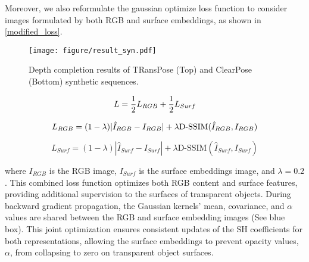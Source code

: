 Moreover, we also reformulate the gaussian optimize loss function to consider images formulated by both RGB and surface embeddings, as shown in \eqref{modified_loss}.
\begin{figure*}[]
    \centering
    \texttt{[image: figure/result\_syn.pdf]}
    \caption{Depth completion results of TRansPose (Top) and ClearPose (Bottom) synthetic sequences.}
    \label{fig:syn}
    \vspace{-2mm}
\end{figure*}



 

\small
\begin{equation}
    L = \frac{1}{2}L_{RGB} + \frac{1}{2}L_{Surf}
\label{modified_loss}
\vspace{-4mm}
\end{equation}

\begin{equation}
    L_{RGB} = (1-\lambda)|\hat{I}_{RGB}-I_{RGB}| + \lambda\text{D-SSIM}({\hat{I}_{RGB}, I_{RGB}})
\label{RGB_loss}
\vspace{-4mm}
\end{equation}


\begin{equation}
    L_{Surf} = (1-\lambda)|\hat{I}_{Surf}-I_{Surf}| + \lambda \text{D-SSIM}({\hat{I}_{Surf}, I_{Surf}})
\label{Surf_loss}
\end{equation}

\normalsize

where $I_{RGB}$ is the RGB image, $I_{Surf}$ is the surface embeddings image, and $\lambda = 0.2$. This combined loss function optimizes both RGB content and surface features, providing additional supervision to the surfaces of transparent objects. During backward gradient propagation, the Gaussian kernels' mean, covariance, and $\alpha$ values are shared between the RGB and surface embedding images (See  blue box). This joint optimization ensures consistent updates of the \ac{SH} coefficients for both representations, allowing the surface embeddings to prevent opacity values, $\alpha$, from collapsing to zero on transparent object surfaces.

